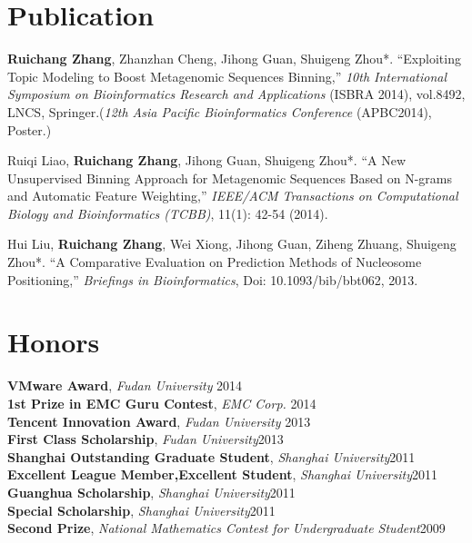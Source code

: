 \documentclass[margin]{res}
\begin{document}
\begin{resume}
\section{Publication}
\textbf{Ruichang Zhang}, Zhanzhan Cheng, Jihong Guan, Shuigeng Zhou*. ``Exploiting Topic Modeling to Boost Metagenomic Sequences Binning,'' \emph{10th International Symposium on Bioinformatics Research and Applications} (ISBRA 2014), vol.8492, LNCS, Springer.(\emph{12th Asia Pacific Bioinformatics Conference} (APBC2014), Poster.)\\
\begin{spacing}{0.2}
\end{spacing}
Ruiqi Liao, \textbf{Ruichang Zhang}, Jihong Guan, Shuigeng Zhou*. ``A New Unsupervised Binning Approach for Metagenomic Sequences Based on N-grams and Automatic Feature Weighting,'' \emph{IEEE/ACM Transactions on Computational Biology and Bioinformatics (TCBB)}, 11(1): 42-54 (2014).\\
\begin{spacing}{0.2}
\end{spacing}
Hui Liu, \textbf{Ruichang Zhang}, Wei Xiong, Jihong Guan, Ziheng Zhuang, Shuigeng Zhou*. ``A Comparative Evaluation on Prediction Methods of Nucleosome Positioning,''  \emph{Briefings in Bioinformatics}, Doi: 10.1093/bib/bbt062, 2013.\\
\section{Honors}
\textbf{VMware Award}, \emph{Fudan University} \hfill2014\\
\textbf{1st Prize in EMC Guru Contest}, \emph{EMC Corp.} \hfill2014\\
\textbf{Tencent Innovation Award}, \emph{Fudan University} \hfill2013\\
\textbf{First Class Scholarship}, \emph{Fudan University}\hfill2013\\
\textbf{Shanghai Outstanding Graduate Student}, \emph{Shanghai University}\hfill 2011\\
\textbf{Excellent League Member,Excellent Student}, \emph{Shanghai University}\hfill 2011\\
\textbf{Guanghua Scholarship}, \emph{Shanghai University}\hfill 2011\\
\textbf{Special Scholarship}, \emph{Shanghai University}\hfill 2011\\
\textbf{Second Prize}, \emph{National Mathematics Contest for Undergraduate Student}\hfill 2009\\


\end{resume}
\end{document}

